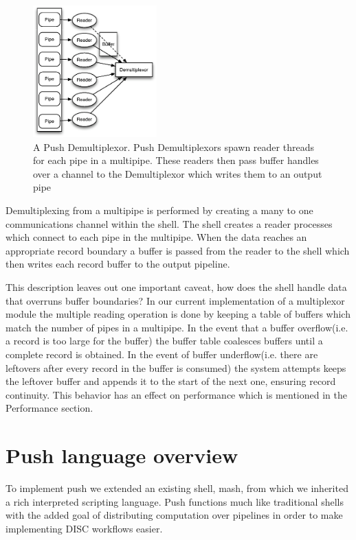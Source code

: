 \documentclass[11pt, letterpaper]{article}
\begin{document}
\begin{figure}[htp]
\centering
\includegraphics[height=2.0in]{demux.eps}
\caption{A Push Demultiplexor. Push Demultiplexors spawn reader threads for each pipe in a multipipe. These readers then pass buffer handles over a channel to the Demultiplexor which writes them to an output pipe}\label{fig:demux}
\end{figure}
Demultiplexing from a multipipe is performed by creating a many to one communications channel within the shell. The shell creates a reader processes which connect to each pipe in the multipipe. When the data reaches an appropriate record boundary a buffer is passed from the reader to the shell which then writes each record buffer to the output pipeline. 

This description leaves out one important caveat, how does the shell handle data that overruns buffer boundaries? In our current implementation of a multiplexor module the multiple reading operation is done by keeping a table of buffers which match the number of pipes in a multipipe. In the event that a buffer overflow(i.e. a record is too large for the buffer) the buffer table coalesces buffers until a complete record is obtained. In the event of buffer underflow(i.e. there are leftovers after every record in the buffer is consumed) the system attempts keeps the leftover buffer and appends it to the start of the next one, ensuring record continuity. This behavior has an effect on performance which is mentioned in the Performance section. 

\section{Push language overview}

To implement push we extended an existing shell, mash\cite{mashman}, from which we inherited a rich interpreted scripting language. Push functions much like traditional shells with the added goal of distributing computation over pipelines in order to make implementing DISC workflows easier. 
\end{document}
